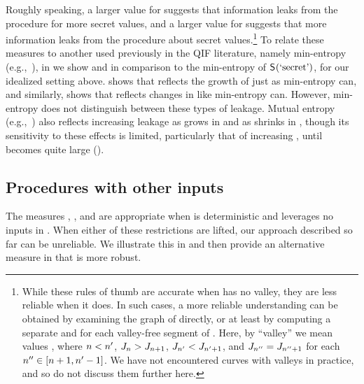 Roughly speaking, a larger value for \secretsSetSizeMin{} suggests
that information leaks from the procedure for more secret values, and
a larger value for \secretsSetSizeMax{} suggests that more information
leaks from the procedure about secret values.\footnote{While these
rules of thumb are accurate when \Jaccard{\secretsSetSize} has no
valley, they are less reliable when it does.  In such cases, a more
reliable understanding can be obtained by examining the graph of
\Jaccard{\secretsSetSize} directly, or at least by computing a
separate \secretsSetSizeMin{} and \secretsSetSizeMax{} for each
valley-free segment of \Jaccard{\secretsSetSize}.  Here, by ``valley''
we mean values \secretsSetSize, \secretsSetSizeAlt where
$n < n'$, $J_{n} >
J_{n+1}$, $J_{n'} <
J_{n'+1}$, and $J_{n''}
= J_{n''+1}$ for each $n''
\in [n+1, n'-1]$.  We have not
encountered \Jaccard{\secretsSetSize} curves with valleys in practice,
and so do not discuss them further here.}  To relate these measures to
another used previously in the \gls{QIF} literature, namely min-entropy
(e.g.,~\cite{geoffrey2011,doi:10.1137/060651380}), in
 we show \secretsSetSizeMin{} and
\secretsSetSizeMax{} in comparison to the min-entropy of
$\mathsf{S}_{}(\textrm{`secret'})$, for our idealized setting above.
 shows that \secretsSetSizeMin{} reflects the
growth of \setSize{\classesUnion} just as min-entropy can, and
similarly,  shows that \secretsSetSizeMax{}
reflects changes in \classesSize like min-entropy can.  However,
min-entropy does not distinguish between these types of leakage.
Mutual entropy
(e.g.,~\cite{Clark:2005:QIF,Kopf:2007:IMA:1315245.1315282,Malacaria:2007:AST})
also reflects increasing leakage as \setSize{\classesUnion} grows in
 and as \classesSize shrinks in
, though its sensitivity to these effects is
limited, particularly that of increasing \setSize{\classesUnion},
until \setSize{\classesUnion} becomes quite large
().

\subsection{Procedures with other inputs}
\label{sscf:sec:measurement:random}

The measures \Jaccard{\secretsSetSize}, \secretsSetSizeMin{}, and
\secretsSetSizeMax{} are appropriate when \proc is deterministic and
leverages no inputs in \AIIFn{}.  When either of these restrictions
are lifted, our approach described so far can be unreliable.  
We
illustrate this in  and then
provide an alternative measure in
 that is more robust.


